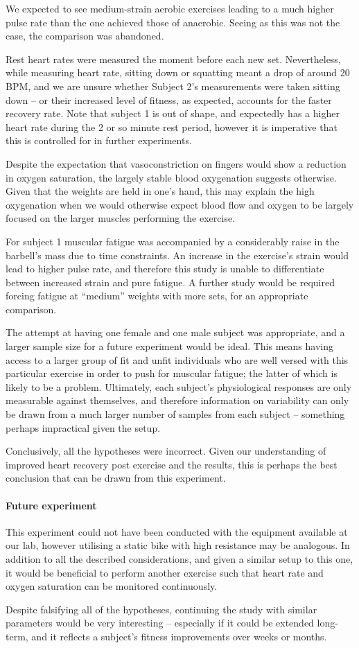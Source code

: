 We expected to see medium-strain aerobic exercises leading to a much higher pulse rate than the one achieved those of anaerobic.
Seeing as this was not the case, the comparison was abandoned.

Rest heart rates were measured the moment before each new set.
Nevertheless, while measuring heart rate, sitting down or squatting meant a drop of around 20 BPM, and we are unsure whether Subject 2's measurements were taken sitting down – or their increased level of fitness, as expected, accounts for the faster recovery rate.
Note that subject 1 is out of shape, and expectedly has a higher heart rate during the 2 or so minute rest period, however it is imperative that this is controlled for in further experiments.

Despite the expectation that vasoconstriction on fingers would show a reduction in oxygen saturation, the largely stable blood oxygenation suggests otherwise.
Given that the weights are held in one's hand, this may explain the high oxygenation when we would otherwise expect blood flow and oxygen to be largely focused on the larger muscles performing the exercise.

For subject 1 muscular fatigue was accompanied by a considerably raise in the barbell's mass due to time constraints.
An increase in the exercise's strain would lead to higher pulse rate, and therefore this study is unable to differentiate between increased strain and pure fatigue.
A further study would be required forcing fatigue at ``medium'' weights with more sets, for an appropriate comparison.

The attempt at having one female and one male subject was appropriate, and a larger sample size for a future experiment would be ideal.
This means having access to a larger group of fit and unfit individuals who are well versed with this particular exercise in order to push for muscular fatigue; the latter of which is likely to be a problem.
Ultimately, each subject's physiological responses are only measurable against themselves, and therefore information on variability can only be drawn from a much larger number of samples from each subject -- something perhaps impractical given the setup.

Conclusively, all the hypotheses were incorrect.
Given our understanding of improved heart recovery post exercise and the results, this is perhaps the best conclusion that can be drawn from this experiment.

\paragraph{Future experiment}
This experiment could not have been conducted with the equipment available at our lab, however utilising a static bike with high resistance may be analogous. 
In addition to all the described considerations, and given a similar setup to this one, it would be beneficial to perform another exercise such that heart rate and oxygen saturation can be monitored continuously.

Despite falsifying all of the hypotheses, continuing the study with similar parameters would be very interesting -- especially if it could be extended long-term, and it reflects a subject's fitness improvements over weeks or months.